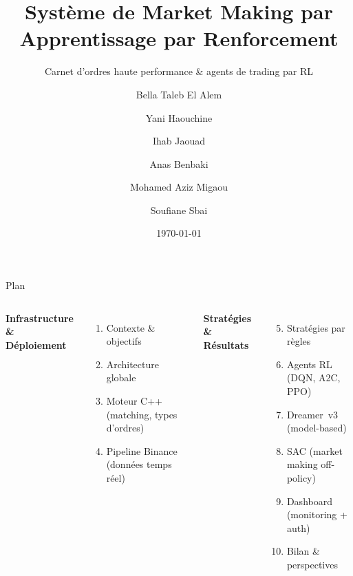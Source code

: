 \documentclass[11pt,aspectratio=169]{beamer}
\title[Système de Market Making par RL]{Système de Market Making par Apprentissage par Renforcement}
\subtitle{Carnet d'ordres haute performance \& agents de trading par RL}
\author[Équipe PFA]{Bella Taleb El Alem \and Yani Haouchine \and Ihab Jaouad \and Anas Benbaki \and Mohamed Aziz Migaou \and Soufiane Sbai}
\institute[ENSEIRB-MATMECA]{ENSEIRB-MATMECA \\ PFA}
\date{\today}
\begin{document}

\begin{frame}
    \titlepage
\end{frame}

\begin{frame}{Plan}
    \begin{columns}[T]
        \textbf{\color{enseirbblue}Infrastructure \& Déploiement}
        \begin{enumerate}
            \item Contexte \& objectifs
            \item Architecture globale
            \item Moteur C++ (matching, types d'ordres)
            \item Pipeline Binance (données temps réel)
        \end{enumerate}
        \textbf{\color{enseirbblue}Stratégies \& Résultats}
        \begin{enumerate}\setcounter{enumi}{4}
            \item Stratégies par règles
            \item Agents RL (DQN, A2C, PPO)
            \item Dreamer~v3 (model-based)
            \item \alert{SAC} (market making off-policy)
            \item \alert{Dashboard} (monitoring + auth)
            \item Bilan \& perspectives
        \end{enumerate}
    \end{columns}
\end{frame}

\end{document}
